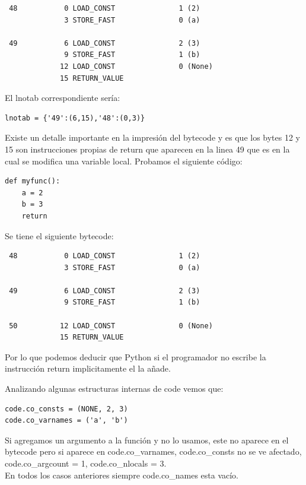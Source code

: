 \documentclass[10pt,a4paper]{article}
\begin{document}
\begin{verbatim}
 48           0 LOAD_CONST               1 (2)
              3 STORE_FAST               0 (a)

 49           6 LOAD_CONST               2 (3)
              9 STORE_FAST               1 (b)
             12 LOAD_CONST               0 (None)
             15 RETURN_VALUE 
\end{verbatim}

El lnotab correspondiente sería:

\begin{verbatim}
lnotab = {'49':(6,15),'48':(0,3)}
\end{verbatim}

Existe un detalle importante en la impresión del bytecode y es que los bytes 12 y 15 son instrucciones propias de return que aparecen en la linea 49 que es en la cual se modifica una variable local.  Probamos el siguiente código:

\begin{verbatim}
def myfunc():
    a = 2
    b = 3
	return
\end{verbatim}

Se tiene el siguiente bytecode:

\begin{verbatim}
 48           0 LOAD_CONST               1 (2)
              3 STORE_FAST               0 (a)

 49           6 LOAD_CONST               2 (3)
              9 STORE_FAST               1 (b)

 50          12 LOAD_CONST               0 (None)
             15 RETURN_VALUE 
\end{verbatim}

Por lo que podemos deducir que Python si el programador no escribe la instrucción return implicitamente el la añade.

Analizando algunas estructuras internas de code vemos que:

\begin{verbatim}
code.co_consts = (NONE, 2, 3)
code.co_varnames = ('a', 'b')
\end{verbatim}

Si agregamos un argumento a la función y no lo usamos, este no aparece en el bytecode pero si aparece en code.co\_varnames, code.co\_consts no se ve afectado, code.co\_argcount = 1, code.co\_nlocals = 3. \\

En todos los casos anteriores siempre code.co\_names esta vacío.\\
\end{document}
